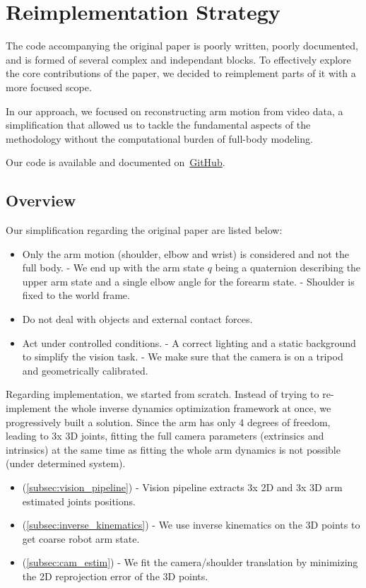 \section{Reimplementation Strategy}
\label{sec:remplementation}

The code accompanying the original paper  is poorly written, poorly documented, and is formed of several complex and independant blocks. 
To effectively explore the core contributions of the paper,
we decided to reimplement parts of it with a more focused scope.

In our approach, we focused on reconstructing arm motion from video data,
a simplification that allowed us to tackle the fundamental 
aspects of the methodology without the computational burden of full-body modeling.

Our code is available and documented on~\href{https://github.com/balthazarneveu/monocular_pose_and_forces_estimation}{GitHub}.

\subsection{Overview}
\label{subsec:overview}
Our simplification regarding the original paper are listed below:
\begin{itemize}
    \item Only the arm motion (shoulder, elbow and wrist) is considered and not the full body.
    \subitem - We end up with the arm state $q$ being a quaternion describing 
    the upper arm state and a single elbow angle for the forearm state.
    \subitem - Shoulder is fixed to the world frame.
    \item Do not deal with objects and external contact forces.
    \item Act under controlled conditions.
    \subitem - A correct lighting and a static background to simplify the vision task.
    \subitem - We make sure that the camera is on a tripod and geometrically calibrated.
\end{itemize}

Regarding implementation, we started from scratch. Instead of trying to re-implement
the whole inverse dynamics optimization framework at once, we progressively built a solution.
Since the arm has only 4 degrees of freedom, leading to 3x 3D joints, 
fitting the full camera parameters (extrinsics and intrinsics) at the same time
as fitting the whole arm dynamics is not possible (under determined system).
\begin{itemize}
    \item (\ref{subsec:vision_pipeline}) - Vision pipeline 
    extracts 3x 2D and 3x 3D arm estimated joints positions.
    \item (\ref{subsec:inverse_kinematics}) - We use inverse kinematics  
    on the 3D points to get coarse robot arm state.
    \item (\ref{subsec:cam_estim}) - We fit the camera/shoulder translation 
    by minimizing the 2D reprojection error of the 3D points.
\end{itemize}



